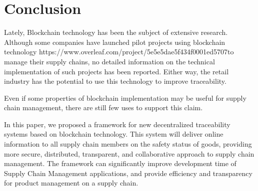 \section{Conclusion} \label{sec:Conclusion}

Lately, Blockchain technology has been the subject of extensive research. Although some companies have launched pilot projects using blockchain technology https://www.overleaf.com/project/5e5e5dae5f434f0001ed5707to manage their supply chains, no detailed information on the technical implementation of such projects has been reported. Either way, the retail industry has the potential to use this technology to improve traceability.

Even if some properties of blockchain implementation may be useful for supply chain management, there are still few uses to support this claim. 

In this paper, we proposed a framework for new decentralized traceability systems based on blockchain technology. This system will deliver online information to all supply chain members on the safety status of goods, providing more secure, distributed, transparent, and collaborative approach to supply chain management. The framework can significantly improve development time of Supply Chain Management applications, and provide efficiency and transparency for product management on a supply chain.